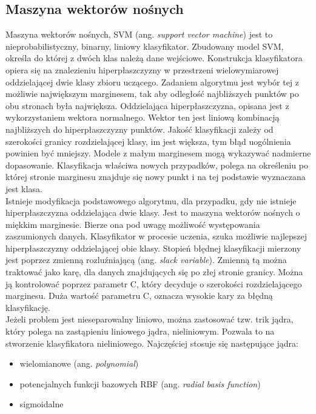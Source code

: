 \subsection{Maszyna wektorów nośnych}
Maszyna wektorów nośnych, SVM (ang. \textit{support vector machine}) jest to nieprobabilistyczny, binarny, liniowy klasyfikator. Zbudowany model SVM, określa do której z dwóch klas należą dane wejściowe. Konstrukcja klasyfikatora opiera się na znalezieniu hiperpłaszczyzny  w przestrzeni wielowymiarowej oddzielającej dwie klasy zbioru uczącego. Zadaniem algorytmu jest wybór tej z możliwie największym marginesem, tak aby odległość najbliższych punktów po obu stronach była największa. Oddzielająca hiperpłaszczyzna, opisana jest z wykorzystaniem wektora normalnego. Wektor ten jest liniową kombinacją najbliższych do hiperpłaszczyzny punktów. Jakość klasyfikacji zależy od szerokości granicy rozdzielającej klasy, im jest większa, tym błąd uogólnienia powinien być mniejszy. Modele z małym marginesem mogą wykazywać nadmierne dopasowanie. Klasyfikacja właściwa nowych przypadków, polega na określeniu po której stronie marginesu znajduje się nowy punkt i na tej podstawie wyznaczana jest klasa. \\
Istnieje modyfikacja podstawowego algorytmu, dla przypadku, gdy nie istnieje hiperpłaszczyzna oddzielająca dwie klasy. Jest to maszyna wektorów nośnych o miękkim marginesie. Bierze ona pod uwagę możliwość występowania zaszumionych danych. Klasyfikator w procesie uczenia, szuka możliwie najlepszej hiperpłaszczyzny oddzielającej obie klasy. Stopień błędnej klasyfikacji mierzony jest poprzez zmienną rozluźniającą (ang. \textit{slack variable}). Zmienną tą można traktować jako karę, dla danych znajdujących się po złej stronie granicy. Można ją kontrolować poprzez parametr C, który decyduje o szerokości rozdzielającego marginesu. Duża wartość parametru C, oznacza wysokie kary za błędną klasyfikację. \\
Jeżeli problem jest nieseparowalny  liniowo, można zastosować tzw. trik jądra, który polega na zastąpieniu liniowego jądra, nieliniowym. Pozwala to na stworzenie klasyfikatora nieliniowego. Najczęściej stosuje się następujące jądra:
\begin{itemize}
	\item wielomianowe (ang. \textit{polynomial})
	\item potencjalnych funkcji bazowych RBF (ang. \textit{radial basis function})
	\item sigmoidalne
\end{itemize}

